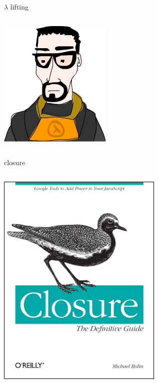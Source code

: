 \documentclass{beamer}
\begin{document}
\begin{frame}{$\lambda$ lifting}
  \begin{columns}
    \begin{column}[b]{3.8cm}
      \includegraphics[scale=0.4]{lambda}
    \end{column}
    \begin{column}[b]{6.2cm}
      
      
    \end{column}
  \end{columns}
\end{frame}

\begin{frame}{closure}
  \begin{columns}
    \begin{column}[b]{3.8cm}
      \includegraphics[scale=0.3]{closure}
    \end{column}
    \begin{column}[b]{6.2cm}
      
    \end{column}
  \end{columns}
\end{frame}
\end{document}
